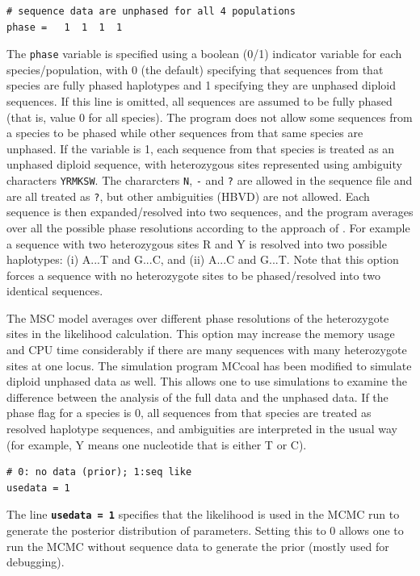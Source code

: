 \documentclass[a4paper]{book}
\numberwithin{equation}{section} \renewcommand{\baselinestretch}{0.55}
\begin{document}
\begin{verbatim}
# sequence data are unphased for all 4 populations
phase =   1  1  1  1
\end{verbatim}
The \texttt{phase} variable is specified using a boolean (0/1)
indicator variable for each species/population, with 0 (the default)
specifying that sequences from that species are fully phased
haplotypes and 1 specifying they are unphased diploid sequences.  If
this line is omitted, all sequences are assumed to be fully phased
(that is, value 0 for all species).  The program does not allow some
sequences from a species to be phased while other sequences from that
same species are unphased.  If the variable is 1, each sequence from
that species is treated as an unphased diploid sequence, with
heterozygous sites represented using ambiguity characters
\texttt{YRMKSW}. The chararcters \texttt{N}, \texttt{-} and \texttt{?}
are allowed in the sequence file and are all treated as \texttt{?},
but other ambiguities (HBVD) are not allowed.  Each sequence is then
expanded/resolved into two sequences, and the program averages over
all the possible phase resolutions according to the approach of
\citet{Gronau2011}.  For example a sequence with two heterozygous
sites R and Y is resolved into two possible haplotypes: (i) A...T and
G...C, and (ii) A...C and G...T.  Note that this option forces a
sequence with no heterozygote sites to be phased/resolved into two
identical sequences.

The MSC model averages over different phase resolutions of the
heterozygote sites in the likelihood calculation.  This option may
increase the memory usage and CPU time considerably if there are many
sequences with many heterozygote sites at one locus.  The simulation
program MCcoal has been modified to simulate diploid unphased data as
well.  This allows one to use simulations to examine the difference
between the analysis of the full data and the unphased data.  If the
phase flag for a species is 0, all sequences from that species are
treated as resolved haplotype sequences, and ambiguities are
interpreted in the usual way (for example, Y means one nucleotide that
is either T or C).

\begin{verbatim}
# 0: no data (prior); 1:seq like
usedata = 1  
\end{verbatim}
The line \texttt{\textbf{usedata = 1}} specifies that the likelihood
is used in the MCMC run to generate the posterior distribution of
parameters. Setting this to 0 allows one to run the MCMC without
sequence data to generate the prior (mostly used for debugging).
\end{document}
